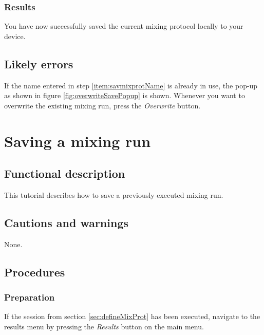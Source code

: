 \subsubsection{Results}
You have now successfully saved the current mixing protocol locally to your device.

\subsection{Likely errors}
If the name entered in step \ref{item:savmixprotName} is already in use, the pop-up as shown in figure \ref{fig:overwriteSavePopup} is shown. Whenever you want to overwrite the existing mixing run, press the \emph{Overwrite} button.


\section{Saving a mixing run}\label{sec:savmixrun}

\subsection{Functional description}
This tutorial describes how to save a previously executed mixing run.

\subsection{Cautions and warnings}
None.

\subsection{Procedures}

\subsubsection{Preparation}
If the session from section \ref{sec:defineMixProt} has been executed, navigate to the results menu by pressing the \emph{Results} button on the main menu.

